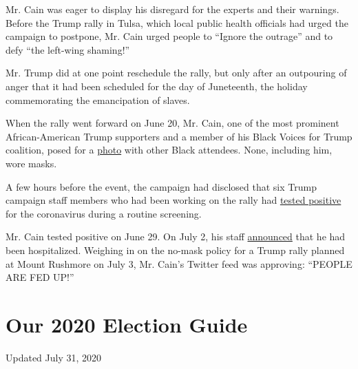 Mr. Cain was eager to display his disregard for the experts and their
warnings. Before the Trump rally in Tulsa, which local public health
officials had urged the campaign to postpone, Mr. Cain urged people to
``Ignore the outrage'' and to defy ``the left-wing shaming!''

Mr. Trump did at one point reschedule the rally, but only after an
outpouring of anger that it had been scheduled for the day of
Juneteenth, the holiday commemorating the emancipation of slaves.

When the rally went forward on June 20, Mr. Cain, one of the most
prominent African-American Trump supporters and a member of his Black
Voices for Trump coalition, posed for a
\href{https://pbs.twimg.com/media/Ea_lixbWAAAdPOP.jpg}{photo} with other
Black attendees. None, including him, wore masks.

A few hours before the event, the campaign had disclosed that six Trump
campaign staff members who had been working on the rally had
\href{https://www.nytimes3xbfgragh.onion/2020/06/20/us/trump-rally-tulsa.html?action=click\&module=Top\%20Stories\&pgtype=Homepage}{tested
positive} for the coronavirus during a routine screening.

Mr. Cain tested positive on June 29. On July 2, his staff
\href{https://twitter.com/THEHermanCain/status/1278735184893009921?s=20}{announced}
that he had been hospitalized. Weighing in on the no-mask policy for a
Trump rally planned at Mount Rushmore on July 3, Mr. Cain's Twitter feed
was approving: ``PEOPLE ARE FED UP!''

\hypertarget{our-2020-election-guide}{%
\section{Our 2020 Election Guide}\label{our-2020-election-guide}}

Updated July 31, 2020


